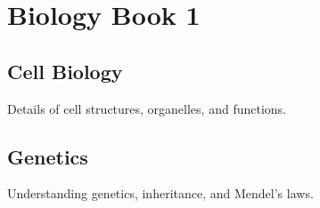 \chapter{Biology Book 1}

\section{Cell Biology}
Details of cell structures, organelles, and functions.

\section{Genetics}
Understanding genetics, inheritance, and Mendel's laws.
